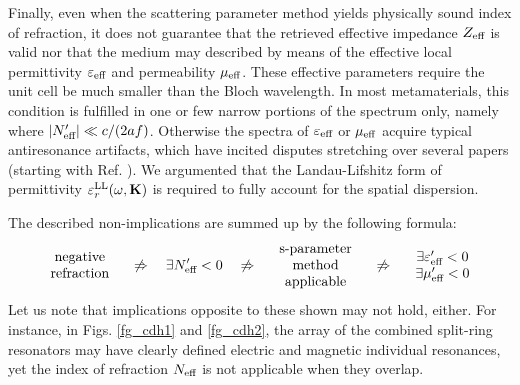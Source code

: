 Finally, even when the scattering parameter method yields physically sound index of refraction, it does not guarantee that the retrieved effective impedance $Z_{\text{eff} }$ is valid nor that the medium may described by means of the effective local permittivity $\varepsilon_{\text{eff} }$ and permeability $\mu_{\text{eff} }$. These effective parameters require the unit cell be much smaller than the Bloch wavelength. In most metamaterials, this condition is fulfilled in one or few narrow portions of the spectrum only, namely where $|N_{\text{eff} }'| \ll c/(2af)$. Otherwise the spectra of $\varepsilon_{\text{eff} }$ or $\mu_{\text{eff} }$ acquire typical antiresonance artifacts, which have incited disputes stretching over several papers (starting with Ref. \cite{koschny2003resonant}). We argumented that the Landau-Lifshitz form of permittivity $\varepsilon_r^\text{LL}(\omega,{\mathbf{K}})$ is required to fully account for the spatial dispersion. 

The described non-implications are summed up by the following formula:
\begin{equation}
\begin{array}{c} \text{negative}\\ \text{refraction} \end{array}
\quad\not\Rightarrow\quad  \exists N_{\text{eff} }' < 0 
\quad\not\Rightarrow\quad \begin{array}{c} \text{s-parameter}\\ \text{method}\\ \text{applicable}  \end{array}
\quad\not\Rightarrow\quad \begin{array}{c} \exists \varepsilon_{\text{eff} }'<0\\ \exists\mu_{\text{eff} }'<0  \end{array} 
\label{eq_implications}\end{equation} %
Let us note that implications opposite to these shown may not hold, either.  For instance, in Figs. \ref{fg_cdh1} and \ref{fg_cdh2}, the array of the combined split-ring resonators may have clearly defined electric and magnetic individual resonances, yet the index of refraction $N_{\text{eff} }$ is not applicable when they overlap.


